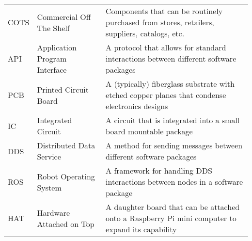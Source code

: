 \begin{longtable}{l m{} m{}}
        COTS & Commercial Off The Shelf & Components that can be routinely purchased from stores, retailers, suppliers, catalogs, etc. \\
        API & Application Program Interface & A protocol that allows for standard interactions between different software packages \\
        PCB & Printed Circuit Board & A (typically) fiberglass substrate with etched copper planes that condense electronics designs \\
        IC & Integrated Circuit & A circuit that is integrated into a small board mountable package \\
        DDS & Distributed Data Service & A method for sending messages between different software packages \\
        ROS & Robot Operating System & A framework for handling DDS interactions between nodes in a software package \\
        HAT & Hardware Attached on Top & A daughter board that can be attached onto a Raspberry Pi mini computer to expand its capability
\end{longtable}
